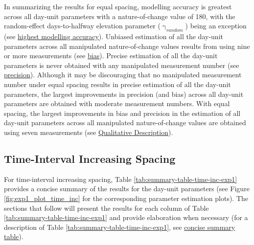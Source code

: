 \documentclass[
12pt, %
twoside,
english]{guelphthesis}
\theoremstyle{definition}
\theoremstyle{definition}
\theoremstyle{definition}
\theoremstyle{definition}
\theoremstyle{remark}
\begin{document}
In summarizing the results for equal spacing, modelling accuracy is greatest across all day-unit parameters with a nature-of-change value of 180, with the random-effect days-to-halfway elevation parameter (\(\upgamma_{random}\)) being an exception (see \protect\hyperlink{nature-change-equal-exp1}{highest modelling accuracy}). Unbiased estimation of all the day-unit parameters across all manipulated nature-of-change values results from using nine or more measurements (see \protect\hyperlink{bias-equal-exp1}{bias}). Precise estimation of all the day-unit parameters is never obtained with any manipulated measurement number (see \protect\hyperlink{precision-equal-exp1}{precision}). Although it may be discouraging that no manipulated measurement number under equal spacing results in precise estimation of all the day-unit parameters, the largest improvements in precision (and bias) across all day-unit parameters are obtained with moderate measurement numbers. With equal spacing, the largest improvements in bias and precision in the estimation of all day-unit parameters across all manipulated nature-of-change values are obtained using seven measurements (see \protect\hyperlink{qualitative-equal-exp1}{Qualitative Description}).

\hypertarget{time-interval-increasing-spacing}{%
\subsection{Time-Interval Increasing Spacing}\label{time-interval-increasing-spacing}}

For time-interval increasing spacing, Table \ref{tab:summary-table-time-inc-exp1} provides a concise summary of the results for the day-unit parameters (see Figure \ref{fig:exp1_plot_time_inc} for the corresponding parameter estimation plots). The sections that follow will present the results for each column of Table \ref{tab:summary-table-time-inc-exp1} and provide elaboration when necessary (for a description of Table \ref{tab:summary-table-time-inc-exp1}, see \protect\hyperlink{concise-tab}{concise summary table}).
\end{document}
